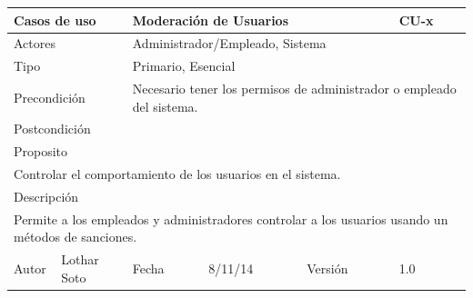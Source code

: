 \documentclass{article}
\begin{document}
\begin{table}[h]
\begin{tabular}{|l|l|l|l|l|l|}
\hline
\multicolumn{2}{|p{2cm}|}{Casos de uso}  & \multicolumn{3}{p{7cm}|}{\textbf{Moderación de Usuarios}} & CU-x \\
\hline
\multicolumn{2}{|p{2cm}|}{Actores}       & \multicolumn{4}{p{8cm}|}{Administrador/Empleado, Sistema}        \\
\hline
\multicolumn{2}{|p{2cm}|}{Tipo}          & \multicolumn{4}{p{8cm}|}{Primario, Esencial}        \\
\hline
\multicolumn{2}{|p{2cm}|}{Precondición}  & \multicolumn{4}{p{8cm}|}{Necesario tener los permisos de administrador o empleado del sistema.}        \\
\hline
\multicolumn{2}{|p{2cm}|}{Postcondición} & \multicolumn{4}{p{8cm}|}{}        \\
\hline
\multicolumn{6}{|p{10cm}|}{Proposito}                                   \\
\hline
\multicolumn{6}{|p{10cm}|}{Controlar el comportamiento de los usuarios en el sistema.}                                            \\
\hline
\multicolumn{6}{|p{10cm}|}{Descripción}                                 \\
\hline
\multicolumn{6}{|p{10cm}|}{Permite a los empleados y administradores controlar a los usuarios usando un métodos de sanciones.}                                            \\
\hline
Autor          &       Lothar Soto        & Fecha    &  8/11/14   &   Versión  & 1.0\\    
\hline
\end{tabular}
\end{table}
\end{document}
